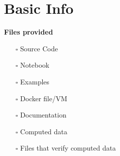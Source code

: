 \documentclass[10pt]{article}
\begin{document}
\section{Basic Info}
\begin{minipage}{0.30\textwidth}
\noindent\parbox[t]{1.2in}{\raggedright%
\vspace{0.5em}
\textbf{Files provided}



\begin{itemize}[topsep=0pt,itemsep=-2pt,leftmargin=13pt]
\item[$\square$] Source Code   %

\item[$\square$] Notebook

\item[$\square$]  Examples

\item[$\square$] Docker file/VM
\end{itemize}

\vspace{0.5em}
}%
\parbox[t]{1.2in}{\raggedright%
\vspace{1em}
\begin{itemize}[topsep=6pt,itemsep=-2pt,leftmargin=13pt]
\item[$\square$] Documentation   %

\item[$\square$]  Computed data

\item[$\square$] Files that verify computed data
\end{itemize}
\vspace{0.5em}
}
\end{minipage}%
\end{document}
